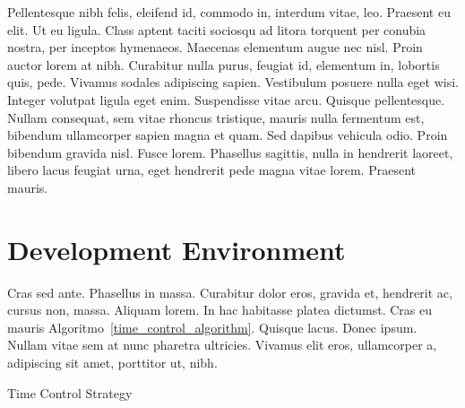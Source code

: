 Pellentesque nibh felis, eleifend id, commodo in, interdum vitae, leo. Praesent eu elit. Ut eu ligula. Class aptent taciti sociosqu ad litora torquent per conubia nostra, per inceptos hymenaeos. Maecenas elementum augue nec nisl. Proin auctor lorem at nibh. Curabitur nulla purus, feugiat id, elementum in, lobortis quis, pede. Vivamus sodales adipiscing sapien. Vestibulum posuere nulla eget wisi. Integer volutpat ligula eget enim. Suspendisse vitae arcu. Quisque pellentesque. Nullam consequat, sem vitae rhoncus tristique, mauris nulla fermentum est, bibendum ullamcorper sapien magna et quam. Sed dapibus vehicula odio. Proin bibendum gravida nisl. Fusce lorem. Phasellus sagittis, nulla in hendrerit laoreet, libero lacus feugiat urna, eget hendrerit pede magna vitae lorem. Praesent mauris.
\section{Development Environment}
Cras sed ante. Phasellus in massa. Curabitur dolor eros, gravida et, hendrerit ac, cursus non, massa. Aliquam lorem. In hac habitasse platea dictumst. Cras eu mauris Algoritmo~\ref{time_control_algorithm}. Quisque lacus. Donec ipsum. Nullam vitae sem at nunc pharetra ultricies. Vivamus elit eros, ullamcorper a, adipiscing sit amet, porttitor ut, nibh. 

\begin{algorithm}[ht]
\DontPrintSemicolon
{}
\caption{Time Control Strategy}
\label{time_control_algorithm}
\end{algorithm}



